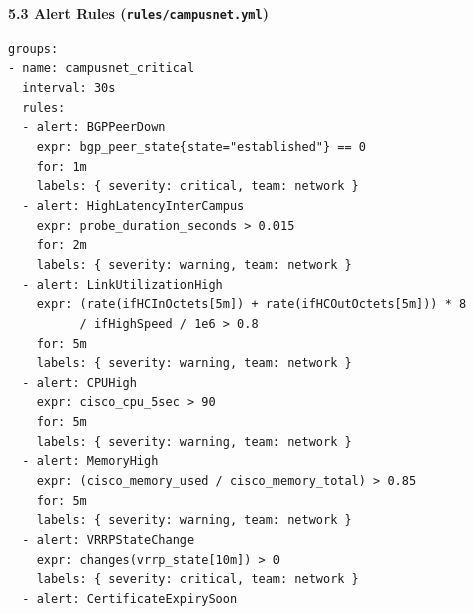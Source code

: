 \documentclass[11pt]{article}
\begin{document}
\begin{exoresolu}
\medskip
\textbf{5.3 Alert Rules (\texttt{rules/campusnet.yml})}\par
\texttt{groups:}\\
\texttt{- name: campusnet\_critical}\\
\texttt{\ \ interval: 30s}\\
\texttt{\ \ rules:}\\
\texttt{\ \ - alert: BGPPeerDown}\\
\texttt{\ \ \ \ expr: bgp\_peer\_state\{state="established"\} == 0}\\
\texttt{\ \ \ \ for: 1m}\\
\texttt{\ \ \ \ labels: \{ severity: critical, team: network \}}\\
\texttt{\ \ - alert: HighLatencyInterCampus}\\
\texttt{\ \ \ \ expr: probe\_duration\_seconds > 0.015}\\
\texttt{\ \ \ \ for: 2m}\\
\texttt{\ \ \ \ labels: \{ severity: warning, team: network \}}\\
\texttt{\ \ - alert: LinkUtilizationHigh}\\
\texttt{\ \ \ \ expr: (rate(ifHCInOctets[5m]) + rate(ifHCOutOctets[5m])) * 8}\\
\texttt{\ \ \ \ \ \ \ \ \ \ / ifHighSpeed / 1e6 > 0.8}\\
\texttt{\ \ \ \ for: 5m}\\
\texttt{\ \ \ \ labels: \{ severity: warning, team: network \}}\\
\texttt{\ \ - alert: CPUHigh}\\
\texttt{\ \ \ \ expr: cisco\_cpu\_5sec > 90}\\
\texttt{\ \ \ \ for: 5m}\\
\texttt{\ \ \ \ labels: \{ severity: warning, team: network \}}\\
\texttt{\ \ - alert: MemoryHigh}\\
\texttt{\ \ \ \ expr: (cisco\_memory\_used / cisco\_memory\_total) > 0.85}\\
\texttt{\ \ \ \ for: 5m}\\
\texttt{\ \ \ \ labels: \{ severity: warning, team: network \}}\\
\texttt{\ \ - alert: VRRPStateChange}\\
\texttt{\ \ \ \ expr: changes(vrrp\_state[10m]) > 0}\\
\texttt{\ \ \ \ labels: \{ severity: critical, team: network \}}\\
\texttt{\ \ - alert: CertificateExpirySoon}\\

\end{exoresolu}
\end{document}

